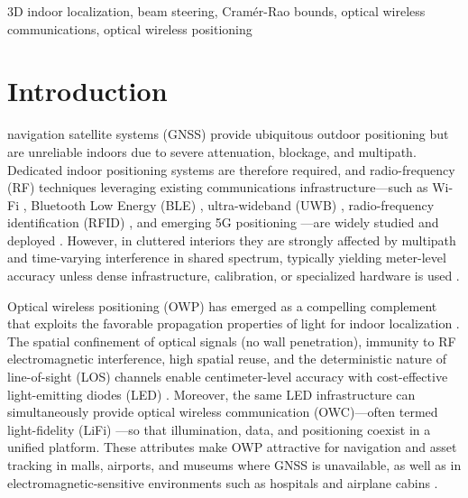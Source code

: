 \documentclass[journal]{IEEEtran}
\newcommand{\added}[1]{{\color{blue}#1}}
\begin{document}
\begin{IEEEkeywords} 
    3D indoor localization, beam steering, Cramér-Rao bounds, optical wireless communications, optical wireless positioning
\end{IEEEkeywords}

\section{Introduction}

 navigation satellite systems (GNSS) provide ubiquitous outdoor positioning but are unreliable indoors due to severe attenuation, blockage, and multipath. \added{Dedicated indoor positioning systems are therefore required, and radio-frequency (RF) techniques leveraging existing communications infrastructure---such as Wi-Fi \cite{He2016}, Bluetooth Low Energy (BLE) \cite{Faragher2015}, ultra-wideband (UWB) \cite{Alarifi2016}, radio-frequency identification (RFID) \cite{Ni2004}, and emerging 5G positioning \cite{Italiano2025}---are widely studied and deployed \cite{Zafari2019, Italiano2025}.} However, in cluttered interiors they are strongly affected by multipath and time-varying interference in shared spectrum, typically yielding meter-level accuracy unless dense infrastructure, calibration, or specialized hardware is used \cite{Lymberopoulos2015, Leitch2023}.

\added{Optical wireless positioning (OWP) has emerged as a compelling complement that exploits the favorable propagation properties of light for indoor localization \cite{Wang2024b}. The spatial confinement of optical signals (no wall penetration), immunity to RF electromagnetic interference, high spatial reuse, and the deterministic nature of line-of-sight (LOS) channels enable centimeter-level accuracy with cost-effective light-emitting diodes (LED) \cite{Trevlakis2023}. Moreover, the same LED infrastructure can simultaneously provide optical wireless communication (OWC)---often termed light-fidelity (LiFi) \cite{Haas:16}---so that illumination, data, and positioning coexist in a unified platform. These attributes make OWP attractive for navigation and asset tracking in malls, airports, and museums where GNSS is unavailable, as well as in electromagnetic-sensitive environments such as hospitals and airplane cabins \cite{Wang2024b, Zhu2025}.}
\end{document}
